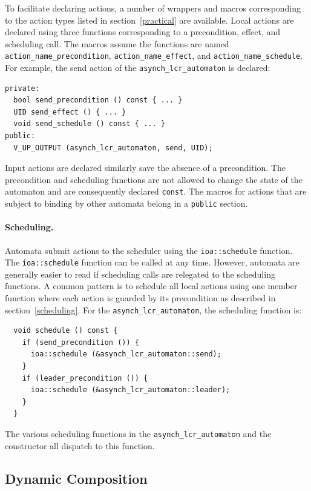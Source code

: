 To facilitate declaring actions, a number of wrappers and macros corresponding to the action types listed in section~\ref{practical} are available.
Local actions are declared using three functions corresponding to a precondition, effect, and scheduling call.
The macros assume the functions are named \verb+action_name_precondition+, \verb+action_name_effect+, and \verb+action_name_schedule+.
For example, the send action of the \verb+asynch_lcr_automaton+ is declared:
\begin{lstlisting}
private:
  bool send_precondition () const { ... }
  UID send_effect () { ... }
  void send_schedule () const { ... }
public:
  V_UP_OUTPUT (asynch_lcr_automaton, send, UID);
\end{lstlisting}
Input actions are declared similarly save the absence of a precondition.
The precondition and scheduling functions are not allowed to change the state of the automaton and are consequently declared \verb+const+.
The macros for actions that are subject to binding by other automata belong in a \verb+public+ section.

\paragraph{Scheduling.}
Automata submit actions to the scheduler using the \verb+ioa::schedule+ function.
The \verb+ioa::schedule+ function can be called at any time.
However, automata are generally easier to read if scheduling calls are relegated to the scheduling functions.
A common pattern is to schedule all local actions using one member function where each action is guarded by its precondition as described in section~\ref{scheduling}.
For the \verb+asynch_lcr_automaton+, the scheduling function is:
\begin{lstlisting}
  void schedule () const {
    if (send_precondition ()) {
      ioa::schedule (&asynch_lcr_automaton::send);
    }
    if (leader_precondition ()) {
      ioa::schedule (&asynch_lcr_automaton::leader);
    }
  }
\end{lstlisting}
The various scheduling functions in the \verb+asynch_lcr_automaton+ and the constructor all dispatch to this function.

\subsection{Dynamic Composition}

